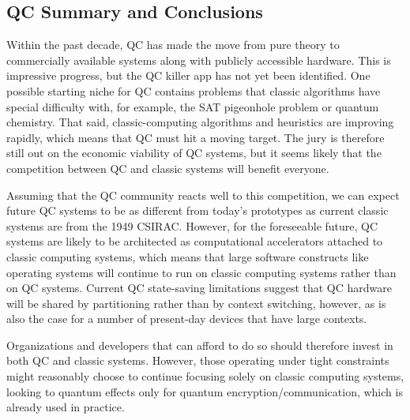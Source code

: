\subsection{QC Summary and Conclusions}
\label{sec:future:QC Summary and Conclusions}

Within the past decade, QC has made the move from pure theory to
commercially available systems along with publicly accessible hardware.
This is impressive progress, but the QC killer app has not yet been
identified.
One possible starting niche for QC contains problems that classic algorithms
have special difficulty with, for example, the SAT pigeonhole problem
or quantum chemistry.
That said, classic-computing algorithms and heuristics are improving
rapidly, which means that QC must hit a moving target.
The jury is therefore still out on the economic viability of QC systems,
but it seems likely that the competition between
QC and classic systems will benefit everyone.

Assuming that the QC community reacts well to this competition,
we can expect future QC systems to be as different from
today's prototypes as current classic systems are from the 1949 CSIRAC.
However, for the foreseeable future, QC systems are likely to be
architected as computational accelerators attached to classic computing
systems,
which means that large software constructs like operating systems will
continue to run on classic computing systems rather than on QC systems.
Current QC state-saving limitations suggest that QC hardware will be shared by
partitioning rather than by context switching, however, as is also
the case for a number of present-day devices that have large contexts.

Organizations and developers that can afford to do so should therefore
invest in both QC and classic systems.
However, those operating under tight constraints might reasonably choose
to continue focusing solely on classic computing systems, looking to
quantum effects only for quantum encryption/communication, which is
already used in practice.
